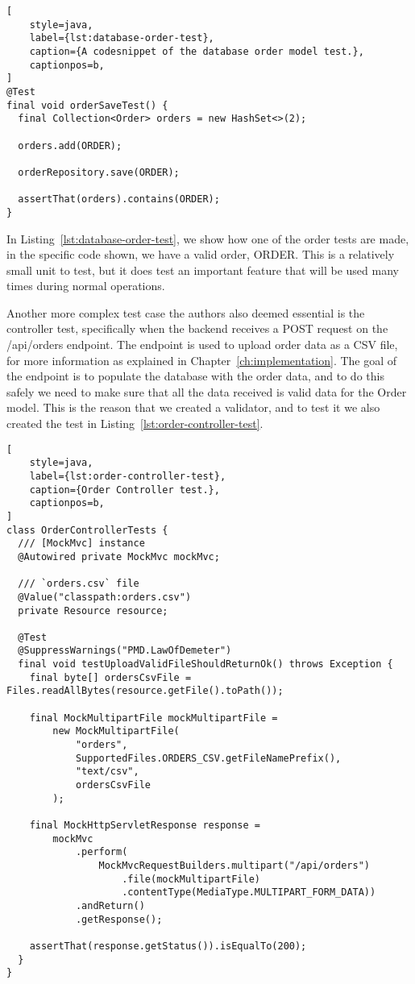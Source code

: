
\begin{lstlisting}[
    style=java,
    label={lst:database-order-test},
    caption={A codesnippet of the database order model test.},
    captionpos=b,
]
@Test
final void orderSaveTest() {
  final Collection<Order> orders = new HashSet<>(2);

  orders.add(ORDER);

  orderRepository.save(ORDER);

  assertThat(orders).contains(ORDER);
}
\end{lstlisting}

In Listing~\ref{lst:database-order-test}, we show how one of the order tests are made, in the specific code shown,
we have a valid order, ORDER\@.
This is a relatively small unit to test, but it does test an important feature that will be used many times
during normal operations.

Another more complex test case the authors also deemed essential is the controller test, specifically when
the backend receives a POST request on the /api/orders endpoint.
The endpoint is used to upload order data as a CSV file, for more information as explained in
Chapter~\ref{ch:implementation}.
The goal of the endpoint is to populate the database with the order data, and to do this safely we need
to make sure that all the data received is valid data for the Order model.
This is the reason that we created a validator, and to test it we also created the test in
Listing~\ref{lst:order-controller-test}.

\begin{lstlisting}[
    style=java,
    label={lst:order-controller-test},
    caption={Order Controller test.},
    captionpos=b,
]
class OrderControllerTests {
  /// [MockMvc] instance
  @Autowired private MockMvc mockMvc;

  /// `orders.csv` file
  @Value("classpath:orders.csv")
  private Resource resource;

  @Test
  @SuppressWarnings("PMD.LawOfDemeter")
  final void testUploadValidFileShouldReturnOk() throws Exception {
    final byte[] ordersCsvFile = Files.readAllBytes(resource.getFile().toPath());

    final MockMultipartFile mockMultipartFile =
        new MockMultipartFile(
            "orders",
            SupportedFiles.ORDERS_CSV.getFileNamePrefix(),
            "text/csv",
            ordersCsvFile
        );

    final MockHttpServletResponse response =
        mockMvc
            .perform(
                MockMvcRequestBuilders.multipart("/api/orders")
                    .file(mockMultipartFile)
                    .contentType(MediaType.MULTIPART_FORM_DATA))
            .andReturn()
            .getResponse();

    assertThat(response.getStatus()).isEqualTo(200);
  }
}
\end{lstlisting}

